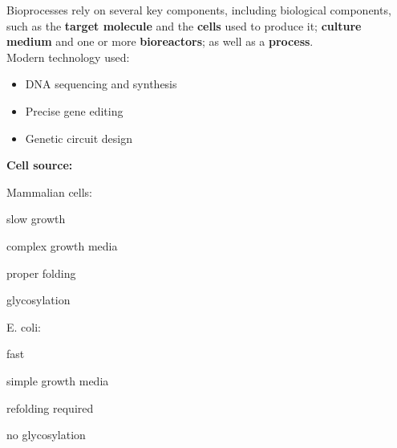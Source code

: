 Bioprocesses rely on several key components, including biological 
components, such as the \textbf{target molecule} and the \textbf{cells} used
to produce it; \textbf{culture medium} and one or more \textbf{bioreactors}; as well as a \textbf{process}.\\

Modern technology used:
    \begin{itemize}
        \item DNA sequencing and synthesis
        \item Precise gene editing
        \item Genetic circuit design
    \end{itemize}

\textbf{Cell source:} \\

\begin{minipage}{0.48\linewidth}
    Mammalian cells:
        \begin{minusitemize}
        \item slow growth
        \item complex growth media
    \end{minusitemize}
    \begin{plusitemize}
        \item proper folding
        \item glycosylation
    \end{plusitemize}
\end{minipage}
\begin{minipage}{0.45\linewidth}
    E. coli:
    \begin{plusitemize}
        \item fast
        \item simple growth media
    \end{plusitemize}
    \begin{minusitemize}
        \item refolding required
        \item no glycosylation
    \end{minusitemize}
\end{minipage}
\vspace{2mm}
